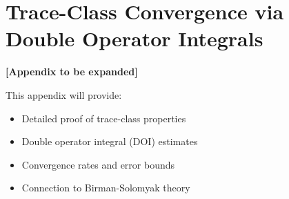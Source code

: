 \section{Trace-Class Convergence via Double Operator Integrals}
\label{app:trace_doi}

\textbf{[Appendix to be expanded]}

This appendix will provide:
\begin{itemize}
\item Detailed proof of trace-class properties
\item Double operator integral (DOI) estimates
\item Convergence rates and error bounds
\item Connection to Birman-Solomyak theory
\end{itemize}
